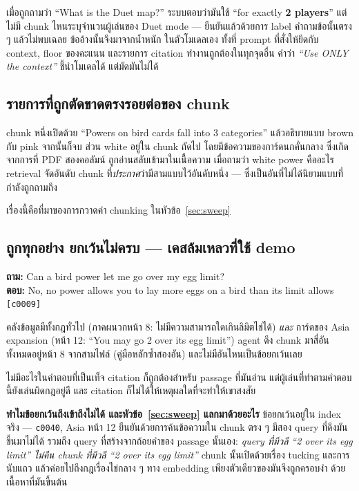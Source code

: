 \documentclass[11pt,a4paper]{article}
\newcommand{\code}[1]{\texttt{\small #1}}
\begin{document}
เมื่อถูกถามว่า “What is the Duet map?” ระบบตอบว่ามันใช้ “for exactly
\textbf{2 players}” แต่ไม่มี chunk ไหนระบุจำนวนผู้เล่นของ Duet mode ---
ยืนยันแล้วด้วยการ label คำถามข้อนั้นตรง ๆ แล้วไม่พบเฉลย ข้ออ้างนั้นจึงมาจากน้ำหนัก
ในตัวโมเดลเอง ทั้งที่ prompt ที่สั่งให้ยึดกับ context, floor ของคะแนน และรายการ
citation ทำงานถูกต้องในทุกจุดอื่น คำว่า \emph{“Use ONLY the context”} ชี้นำโมเดลได้
แต่มัดมันไม่ได้

\subsection{รายการที่ถูกตัดขาดตรงรอยต่อของ chunk}
\label{sec:split}

chunk หนึ่งเปิดด้วย “Powers on bird cards fall into 3 categories”
แล้วอธิบายแบบ brown กับ pink จากนั้นก็จบ ส่วน white อยู่ใน chunk ถัดไป
โดยมีข้อความของการ์ดนกคั่นกลาง ซึ่งเกิดจากการที่ PDF สองคอลัมน์
ถูกอ่านสลับเข้ามาในเนื้อความ เมื่อถามว่า white power คืออะไร
retrieval จัดอันดับ chunk ที่\emph{ประกาศ}ว่ามีสามแบบไว้อันดับหนึ่ง ---
ซึ่งเป็นอันที่ไม่ได้นิยามแบบที่กำลังถูกถามถึง

เรื่องนี้คือที่มาของการกวาดค่า chunking ในหัวข้อ~\ref{sec:sweep}

\subsection{ถูกทุกอย่าง ยกเว้นไม่ครบ --- เคสล้มเหลวที่ใช้ demo}
\label{sec:fc5}

\begin{warnbox}
\textbf{ถาม:} Can a bird power let me go over my egg limit?\\[0.3em]
\textbf{ตอบ:} No, no power allows you to lay more eggs on a bird than its
limit allows \code{[c0009]}
\end{warnbox}

คลังข้อมูลมีทั้งกฎทั่วไป (ภาคผนวกหน้า 8: ไม่มีความสามารถใดเกินลิมิตไข่ได้)
\emph{และ} การ์ดของ Asia expansion (หน้า 12: “You may go 2 over its egg limit”)
agent ดึง chunk มาสี่อัน ทั้งหมดอยู่หน้า 8 จากสามไฟล์ (คู่มือหลักซ้ำสองอัน)
และไม่มีอันไหนเป็นข้อยกเว้นเลย

ไม่มีอะไรในคำตอบที่เป็นเท็จ citation ก็ถูกต้องสำหรับ passage ที่มันอ่าน
แต่ผู้เล่นที่ทำตามคำตอบนี้ยังเล่นผิดกฎอยู่ดี
และ citation ก็ไม่ได้ให้เหตุผลใดที่จะทำให้เขาสงสัย

\textbf{ทำไมข้อยกเว้นถึงเข้าถึงไม่ได้ และหัวข้อ~\ref{sec:sweep} แลกมาด้วยอะไร}\quad
ข้อยกเว้นอยู่ใน index จริง --- \code{c0040}, Asia หน้า 12
ยืนยันด้วยการค้นข้อความใน chunk ตรง ๆ
มีสอง query ที่ดึงมันขึ้นมาไม่ได้ รวมถึง query ที่สร้างจากถ้อยคำของ passage นั้นเอง:
\emph{query ที่มีวลี “2 over its egg limit” ไม่คืน chunk ที่มีวลี
“2 over its egg limit”} chunk นั้นเปิดด้วยเรื่อง tucking และการนับแถว
แล้วค่อยไปถึงกฎเรื่องไข่กลาง ๆ ทาง embedding เพียงตัวเดียวของมันจึงถูกครอบงำ
ด้วยเนื้อหาที่มันขึ้นต้น
\end{document}
